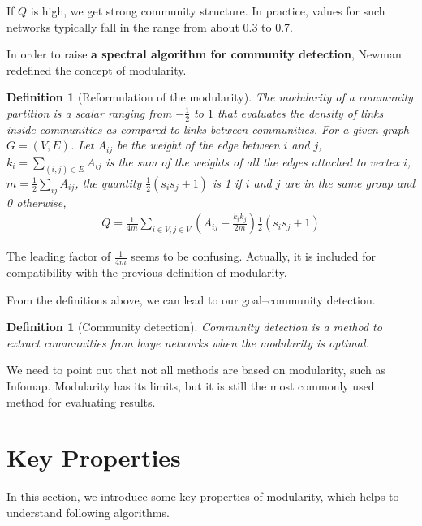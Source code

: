 \documentclass[11pt]{article}
\newtheorem{definition}[theorem]{Definition}
\begin{document}
\noindent If $Q$ is high, we get strong community structure. In practice, values for such networks typically fall in the range from about 0.3 to 0.7.\cite{newman2004}

\noindent In order to raise \textbf{a spectral algorithm for community detection}, Newman redefined the concept of modularity.\cite{newman2006}
\begin{definition}
  [Reformulation of the modularity]
  The modularity of a community partition is a scalar ranging from $-\frac{1}{2}$ to $1$ that evaluates the density of links inside communities as compared to links between communities.
For a given graph $G = (V, E)$. Let $A_{ij}$ be the weight of the edge between $i$ and $j$, $k_{i} = \sum_{(i, j) \in E}A_{ij}$ is the sum of the weights of all the edges attached to vertex $i$,  $m = \frac{1}{2}\sum_{ij}A_{ij}$, the quantity $\frac{1}{2}(s_is_j+1)$ is 1 if $i$ and $j$ are in the same group and 0 otherwise,
\begin{equation}
  \begin{split}
    Q = \frac{1}{4m}\sum_{i \in V, j \in V}(A_{ij} - \frac{k_{i}k_{j}}{2m})\frac{1}{2}(s_is_j+1)
  \end{split}
\end{equation}
\end{definition}
\noindent The leading factor of $\frac{1}{4m}$ seems to be confusing. Actually, it is included for compatibility with the previous definition of modularity.

\noindent From the definitions above, we can lead to our goal--community detection.
\begin{definition}
  [Community detection]
  Community detection is a method to extract communities from large networks when the modularity is optimal.
\end{definition}
\noindent We need to point out that not all methods are based on modularity, such as Infomap\cite{infomap2008}. Modularity has its limits\cite{resolution2007}, but it is still the most commonly used method for evaluating results. 

\section{Key Properties}
In this section, we introduce some key properties of modularity, which helps to understand following algorithms.
\end{document}
